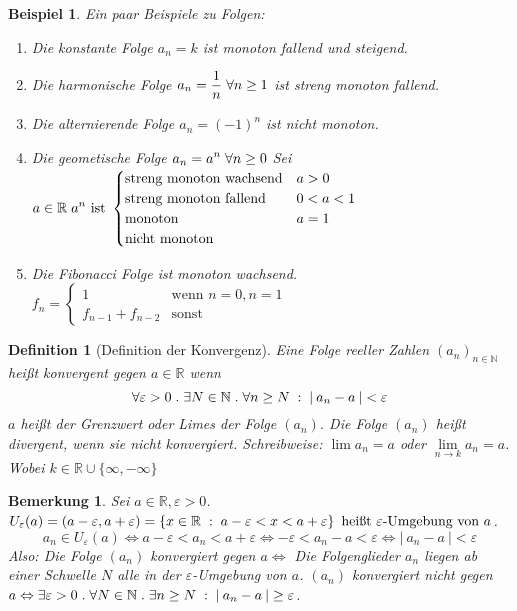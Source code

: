 \documentclass[a4paper,titlepage,oneside]{article}
\def\N{\ensuremath{\mathbb{N}} }
\def\R{\ensuremath{\mathbb{R}} }
\renewcommand{\epsilon}{\ensuremath{\varepsilon} }
\def\fa{\ensuremath{\forall}}
\def\sp{\hspace{0,1cm}}
\def\spdot{\sp.\sp}
\def\spcolon{\sp:\sp}
\newcommand{\abs}[1]{\ensuremath{\left|\:#1\:\right|}}
\newcommand{\menge}[2]{\ensuremath{\left\{#1\sp : \sp #2\right\}}}
\theoremstyle{thmstyle}
\newtheorem{defi}[satz]{Definition}
\newtheorem{bsp}[satz]{Beispiel}
\newtheorem{bem}[satz]{Bemerkung}
\theoremstyle{subthmstyle}
\begin{document}
\begin{bsp}
Ein paar Beispiele zu Folgen:
\begin{enumerate}[label=(\arabic*)]
\item Die konstante Folge \(a_n = k\) ist monoton fallend und steigend.
\item Die harmonische Folge $ \displaystyle a_n = \frac{1}{n} \sp \fa n \ge 1$ ist streng monoton fallend.
\item Die alternierende Folge $ \displaystyle a_n = (-1)^n $ ist nicht monoton.
\item Die geometische Folge $ \displaystyle  a_n = a^n \sp \fa n \ge 0 $ Sei $ \displaystyle a \in \R \sp a^n \text{ ist }
				\begin{cases}			\text{streng monoton wachsend} 	& a > 0\\
									\text{streng monoton fallend} 		& 0 < a < 1\\
									\text{monoton} 					& a = 1\\
									\text{nicht monoton} 				&  \end{cases} $
\item Die Fibonacci Folge ist monoton wachsend. $ \displaystyle f_n = \begin{cases}	1				& \text{wenn } n = 0, n = 1\\
																f_{n-1} + f_{n-2}	& \text{sonst} \end{cases} $
\end{enumerate}
\end{bsp}

\begin{defi}[Definition der Konvergenz]
Eine Folge reeller Zahlen \((a_n)_{n\in\N}\) heißt konvergent gegen \( a\in\R\) wenn
\[\forall \epsilon > 0 \spdot \exists N \in \N \spdot \forall n \ge N \spcolon \abs{a_n - a} < \epsilon\]
\(a\) heißt der Grenzwert oder Limes der Folge \((a_n)\). Die Folge \((a_n)\) heißt divergent, wenn sie nicht konvergiert. Schreibweise: \(\lim{a_n} = a \) oder \( \lim\limits_{n \to k}{a_n} = a \). Wobei \( k \in \R\cup\{\infty, -\infty\}\)
\end{defi}

\begin{bem}
Sei \(a \in \R, \epsilon > 0\). \(U_\epsilon(a) = (a-\epsilon, a+\epsilon) = \menge{x \in \R}{a - \epsilon < x < a + \epsilon} \text{ heißt } \epsilon\text{-Umgebung von }a\).
\[ a_n \in U_\epsilon(a) \Leftrightarrow a-\epsilon < a_n < a + \epsilon \Leftrightarrow -\epsilon < a_n - a < \epsilon \Leftrightarrow \abs{a_n - a} < \epsilon\]
Also: Die Folge \((a_n)\) konvergiert gegen \(a \Leftrightarrow \) Die Folgenglieder \(a_n\) liegen ab einer Schwelle \(N\) alle in der \(\epsilon\)-Umgebung von \(a\). \((a_n)\) konvergiert nicht gegen \(a \Leftrightarrow \exists \epsilon > 0 \spdot \forall N\in\N \spdot \exists n \ge N \spcolon \abs{a_n - a} \ge \epsilon\).
\end{bem}
\end{document}
